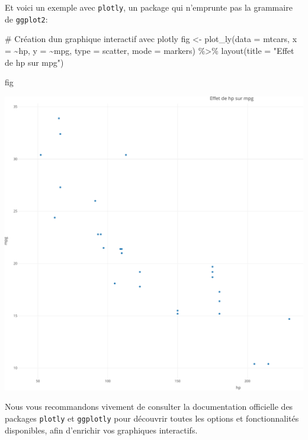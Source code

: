 \documentclass[
  letterpaper,
  DIV=11,
  numbers=noendperiod]{scrreprt}
\newenvironment{Shaded}{\begin{snugshade}}{\end{snugshade}}
\newcommand{\AttributeTok}[1]{\textcolor[rgb]{0.40,0.45,0.13}{#1}}
\newcommand{\CommentTok}[1]{\textcolor[rgb]{0.37,0.37,0.37}{#1}}
\newcommand{\FunctionTok}[1]{\textcolor[rgb]{0.28,0.35,0.67}{#1}}
\newcommand{\NormalTok}[1]{\textcolor[rgb]{0.00,0.23,0.31}{#1}}
\newcommand{\OtherTok}[1]{\textcolor[rgb]{0.00,0.23,0.31}{#1}}
\newcommand{\SpecialCharTok}[1]{\textcolor[rgb]{0.37,0.37,0.37}{#1}}
\newcommand{\StringTok}[1]{\textcolor[rgb]{0.13,0.47,0.30}{#1}}
\begin{document}
Et voici un exemple avec \texttt{plotly}, un package qui n'emprunte pas
la grammaire de \texttt{ggplot2}:

\begin{Shaded}
\begin{Highlighting}[]
\CommentTok{\# Création d\textquotesingle{}un graphique interactif avec plotly}
\NormalTok{fig }\OtherTok{\textless{}{-}} \FunctionTok{plot\_ly}\NormalTok{(}\AttributeTok{data =}\NormalTok{ mtcars, }\AttributeTok{x =} \SpecialCharTok{\textasciitilde{}}\NormalTok{hp, }\AttributeTok{y =} \SpecialCharTok{\textasciitilde{}}\NormalTok{mpg, }\AttributeTok{type =} \StringTok{\textquotesingle{}scatter\textquotesingle{}}\NormalTok{, }\AttributeTok{mode =} \StringTok{\textquotesingle{}markers\textquotesingle{}}\NormalTok{) }\SpecialCharTok{\%\textgreater{}\%}
  \FunctionTok{layout}\NormalTok{(}\AttributeTok{title =} \StringTok{"Effet de hp sur mpg"}\NormalTok{)}

\NormalTok{fig}
\end{Highlighting}
\end{Shaded}

\includegraphics{chapitre_6_files/figure-pdf/unnamed-chunk-14-1.pdf}

Nous vous recommandons vivement de consulter la documentation officielle
des packages \texttt{plotly} et \texttt{ggplotly} pour découvrir toutes
les options et fonctionnalités disponibles, afin d'enrichir vos
graphiques interactifs.
\end{document}
